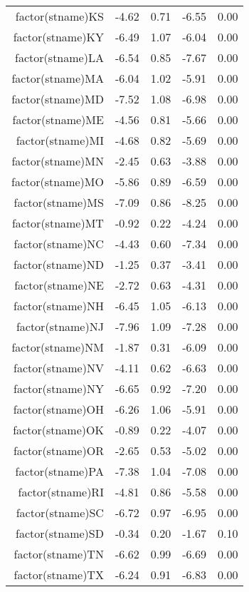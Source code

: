 \begin{table}[ht]
\begin{tabular}{rrrrr}
  factor(stname)KS & -4.62 & 0.71 & -6.55 & 0.00 \\ 
  factor(stname)KY & -6.49 & 1.07 & -6.04 & 0.00 \\ 
  factor(stname)LA & -6.54 & 0.85 & -7.67 & 0.00 \\ 
  factor(stname)MA & -6.04 & 1.02 & -5.91 & 0.00 \\ 
  factor(stname)MD & -7.52 & 1.08 & -6.98 & 0.00 \\ 
  factor(stname)ME & -4.56 & 0.81 & -5.66 & 0.00 \\ 
  factor(stname)MI & -4.68 & 0.82 & -5.69 & 0.00 \\ 
  factor(stname)MN & -2.45 & 0.63 & -3.88 & 0.00 \\ 
  factor(stname)MO & -5.86 & 0.89 & -6.59 & 0.00 \\ 
  factor(stname)MS & -7.09 & 0.86 & -8.25 & 0.00 \\ 
  factor(stname)MT & -0.92 & 0.22 & -4.24 & 0.00 \\ 
  factor(stname)NC & -4.43 & 0.60 & -7.34 & 0.00 \\ 
  factor(stname)ND & -1.25 & 0.37 & -3.41 & 0.00 \\ 
  factor(stname)NE & -2.72 & 0.63 & -4.31 & 0.00 \\ 
  factor(stname)NH & -6.45 & 1.05 & -6.13 & 0.00 \\ 
  factor(stname)NJ & -7.96 & 1.09 & -7.28 & 0.00 \\ 
  factor(stname)NM & -1.87 & 0.31 & -6.09 & 0.00 \\ 
  factor(stname)NV & -4.11 & 0.62 & -6.63 & 0.00 \\ 
  factor(stname)NY & -6.65 & 0.92 & -7.20 & 0.00 \\ 
  factor(stname)OH & -6.26 & 1.06 & -5.91 & 0.00 \\ 
  factor(stname)OK & -0.89 & 0.22 & -4.07 & 0.00 \\ 
  factor(stname)OR & -2.65 & 0.53 & -5.02 & 0.00 \\ 
  factor(stname)PA & -7.38 & 1.04 & -7.08 & 0.00 \\ 
  factor(stname)RI & -4.81 & 0.86 & -5.58 & 0.00 \\ 
  factor(stname)SC & -6.72 & 0.97 & -6.95 & 0.00 \\ 
  factor(stname)SD & -0.34 & 0.20 & -1.67 & 0.10 \\ 
  factor(stname)TN & -6.62 & 0.99 & -6.69 & 0.00 \\ 
  factor(stname)TX & -6.24 & 0.91 & -6.83 & 0.00 \\ 

\end{tabular}
\end{table}
